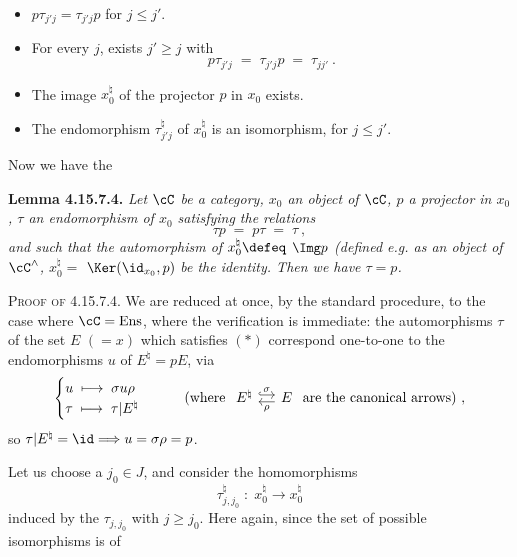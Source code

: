 \begin{itemize}
\item[1°)] $p\tau_{j'j} = \tau_{j'j}p$ for $j \leqslant j'$.
\item[2°)] For every $j$, exists $j' \geqslant j$ with
\[
p\tau_{j'j} \;=\; \tau_{j'j}p \;=\; \tau_{jj'}\ . %
\]
\item[3°)] The image $x_0^\natural$ of the projector $p$ in $x_0$ exists.
\item[4°)] The endomorphism $\tau^\natural_{j'j}$ of $x_0^\natural$ is an isomorphism, for $j \leqslant j'$.
\end{itemize}
Now we have the

\textbf{Lemma 4.15.7.4.} \textit{Let $\cC$ be a category, $x_0$ an object of $\cC$, $p$ a projector in $x_0$, $\tau$ an endomorphism of $x_0$ satisfying the relations}
\[
\tau p \;=\; p\tau \;=\; \tau\ , \tag*{$(*)$}
\]
\textit{and such that the automorphism of $x_0^\natural \defeq$} $\Img p$ \textit{(defined e.g. as an object of $\cC^\wedge$, $x_0^\natural =$} $\Ker(\id_{x_0},p)$ %
\textit{be the identity. Then we have $\tau = p$.}

\textsc{Proof of} 4.15.7.4. We are reduced at once, by the standard procedure, to the case where $\cC = \mathrm{Ens}$, where the verification is immediate: the automorphisms $\tau$ of the set $E$ $(= x)$ which satisfies $(*)$ correspond one-to-one to the endomorphisms $u$ of $E^\natural = pE$, via
\[
\begin{cases}
u \;\longmapsto\; \sigma u \rho \\
\tau \;\longmapsto\; \tau|E^\natural
\end{cases}
\qquad
\text{(where }
\begin{tikzcd}[column sep=small]
E^\natural \arrow[r, hook, shift left, "\sigma"] & E \arrow[l, shift left, "\rho"]
\end{tikzcd}
\text{ are the canonical arrows)}\ ,
\]
so $\tau|E^\natural = \id \Longrightarrow u = \sigma\rho = p$.

Let us choose a $j_0 \in J$, and consider the homomorphisms
\[
\tau^\natural_{j,j_0} \;:\; x_0^\natural \longrightarrow x_0^\natural
\]
induced by the $\tau_{j,j_0}$ with $j \geqslant j_0$. Here again, since the set of possible isomorphisms is of

